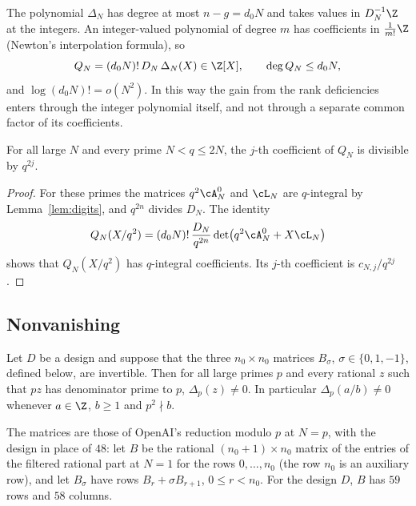 The polynomial $\Delta_N$ has degree at most $n-g=d_0N$ and takes values in $D_N^{-1}\Z$ at the
integers. An integer-valued polynomial of degree $m$ has coefficients in $\frac1{m!}\Z$ (Newton's
interpolation formula), so
\begin{equation}\label{eq:QN}
 Q_N=(d_0N)!\,D_N\,\Delta_N(X)\in\Z[X],\qquad \deg Q_N\le d_0N,
\end{equation}
and $\log(d_0N)!=o(N^2)$. In this way the gain from the rank deficiencies enters through the integer
polynomial itself, and not through a separate common factor of its coefficients.

\begin{lemma}\label{lem:recycling}
For all large $N$ and every prime $N<q\le2N$, the $j$-th coefficient of $Q_N$ is divisible by $q^{2j}$.
\end{lemma}

\begin{proof}
For these primes the matrices $q^2\cA^0_N$ and $\cL_N$ are $q$-integral by Lemma~\ref{lem:digits}, and
$q^{2n}$ divides $D_N$. The identity
\[
 Q_N(X/q^2)=(d_0N)!\,\frac{D_N}{q^{2n}}\det\bigl(q^2\cA^0_N+X\cL_N\bigr)
\]
shows that $Q_N(X/q^2)$ has $q$-integral coefficients. Its $j$-th coefficient is $c_{N,j}/q^{2j}$.
\end{proof}

\subsection{Nonvanishing}
\begin{proposition}\label{prop:nonvanishing}
Let $D$ be a design and suppose that the three $n_0\times n_0$ matrices $B_\sigma$, $\sigma\in\{0,1,-1\}$,
defined below, are invertible. Then for all large primes $p$ and every rational $z$ such that $pz$ has
denominator prime to $p$, $\Delta_p(z)\ne0$. In particular $\Delta_p(a/b)\ne0$ whenever $a\in\Z$, $b\ge1$
and $p^2\nmid b$.
\end{proposition}

The matrices are those of OpenAI's reduction modulo $p$ at $N=p$, with the design in place of $48$: let
$B$ be the rational $(n_0+1)\times n_0$ matrix of the entries of the filtered rational part at $N=1$ for
the rows $0,\dots,n_0$ (the row $n_0$ is an auxiliary row), and let $B_\sigma$ have rows
$B_r+\sigma B_{r+1}$, $0\le r<n_0$. For the design $D$, $B$ has $59$ rows and $58$ columns.

